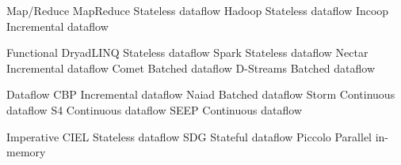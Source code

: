 Map/Reduce
  MapReduce    Stateless dataflow \cite{Dean2008}
  Hadoop       Stateless dataflow 
  Incoop       Incremental dataflow \cite{Bhatotia2011}

Functional
  DryadLINQ    Stateless dataflow \cite{Isard2007,Yu2009}
  Spark        Stateless dataflow \cite{Zaharia,Zaharia2010}
  Nectar       Incremental dataflow \cite{Gunda2010}
  Comet        Batched dataflow \cite{He2010}
  D-Streams    Batched dataflow \cite{Zaharia2012}

Dataflow
  CBP          Incremental dataflow \cite{Logothetis2010}
  Naiad        Batched dataflow \cite{Murray2013}
  Storm        Continuous dataflow \cite{Toshniwal2014}
  S4           Continuous dataflow \cite{Neumeyer2010}
  SEEP         Continuous dataflow \cite{Fernandez2013}

Imperative
  CIEL         Stateless dataflow \cite{Murray2011}
  SDG          Stateful dataflow 
  Piccolo      Parallel in-memory \cite{Power2010}



\newcommand{\SPEentry}[4]{%
  \textbf{#1} \newline%
  #2 &%
  #3 &%
  #4 \\%
  \\%
}

